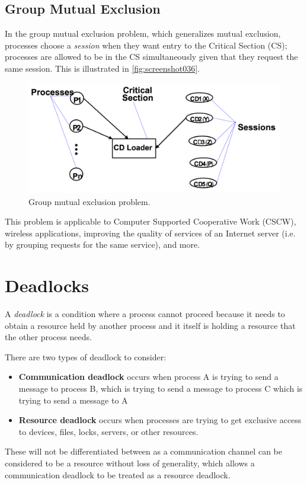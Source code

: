 \subsection{Group Mutual Exclusion}
In the group mutual exclusion problem, which generalizes mutual exclusion, processes choose a \textit{session} when they want entry to the Critical Section (CS); processes are allowed to be in the CS simultaneously given that they request the same session. This is illustrated in \autoref{fig:screenshot036}.

\begin{figure}
\centering
\includegraphics[width=0.7\linewidth]{screenshot036}
\caption{Group mutual exclusion problem.}
\label{fig:screenshot036}
\end{figure}

This problem is applicable to Computer Supported Cooperative Work (CSCW), wireless applications, improving the quality of services of an Internet server (i.e. by grouping requests for the same service), and more.

\section{Deadlocks}
A \textit{deadlock} is a condition where a process cannot proceed because it needs to obtain a resource held by another process and it itself is holding a resource that the other process needs. 

There are two types of deadlock to consider:
\begin{itemize}
\item \textbf{Communication deadlock} occurs when process A is trying to send a message to process B, which is trying to send a message to process C which is trying to send a message to A
\item \textbf{Resource deadlock} occurs when processes are trying to get exclusive access to devices, files, locks, servers, or other resources.
\end{itemize}

These will not be differentiated between as a communication channel can be considered to be a resource without loss of generality, which allows a communication deadlock to be treated as a resource deadlock.

